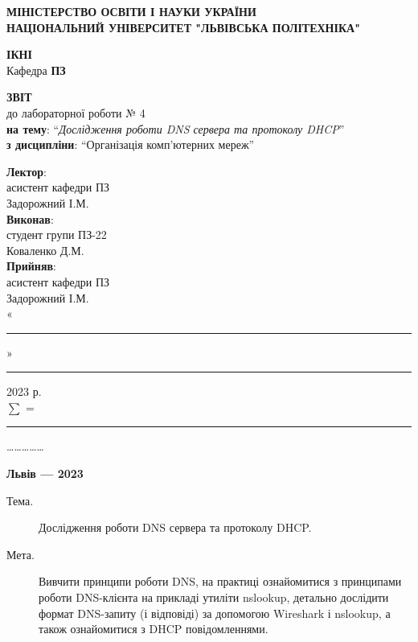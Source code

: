 \documentclass{article}
\newcommand\subject{Організація комп’ютерних мереж}
\newcommand\lecturer{асистент кафедри ПЗ \\ Задорожний І.М.}
\newcommand\teacher{асистент кафедри ПЗ \\ Задорожний І.М.}
\newcommand\mygroup{ПЗ-22}
\newcommand\lab{4}
\newcommand\theme{Дослідження роботи DNS сервера та протоколу DHCP}
\newcommand\purpose{Вивчити принципи роботи DNS, на практиці ознайомитися з принципами роботи DNS-клієнта на прикладі утиліти nslookup, детально дослідити формат DNS-запиту (і відповіді) за допомогою Wireshark і nslookup, а також ознайомитися з DHCP повідомленнями}
\begin{document}
\begin{normalsize}
	\begin{titlepage}
		\thispagestyle{empty}
		\begin{center}
			\textbf{МІНІСТЕРСТВО ОСВІТИ І НАУКИ УКРАЇНИ\\
				НАЦІОНАЛЬНИЙ УНІВЕРСИТЕТ "ЛЬВІВСЬКА ПОЛІТЕХНІКА"}
		\end{center}
		\begin{flushright}
			\textbf{ІКНІ}\\
			Кафедра \textbf{ПЗ}
		\end{flushright}
		\vspace{200pt}
		\begin{center}
			\textbf{ЗВІТ}\\
			\vspace{10pt}
			до лабораторної роботи № \lab\\
			\textbf{на тему}: “\textit{\theme}”\\
			\textbf{з дисципліни}: “\subject”
		\end{center}
		\vspace{112pt}
		\begin{flushright}
			
			\textbf{Лектор}:\\
			\lecturer\\
			\vspace{28pt}
			\textbf{Виконав}:\\
			
			студент групи \mygroup\\
			Коваленко Д.М.\\
			\vspace{28pt}
			\textbf{Прийняв}:\\
			
			\teacher\\
			
			\vspace{28pt}
			«\rule{1cm}{0.15mm}» \rule{1.5cm}{0.15mm} 2023 р.\\
			$\sum$ = \rule{1cm}{0.15mm}……………\\
			
		\end{flushright}
		\vspace{\fill}
		\begin{center}
			\textbf{Львів — 2023}
		\end{center}
	\end{titlepage}
		
	\begin{description}
		\item[Тема.] \theme.
		\item[Мета.] \purpose.
	\end{description}


\end{normalsize}
\end{document}
